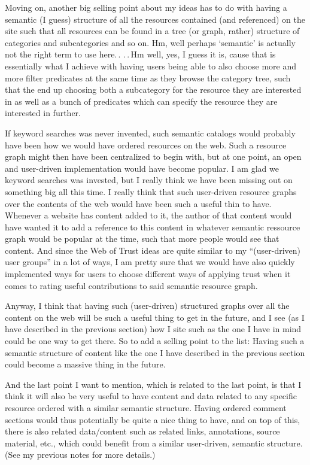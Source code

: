 \documentclass{report}
\begin{document}
Moving on, another big selling point about my ideas has to do with having a semantic (I guess) structure of all the resources contained (and referenced) on the site such that all resources can be found in a tree (or graph, rather) structure of categories and subcategories and so on. Hm, well perhaps `semantic' is actually not the right term to use here.\,. %
.\,.\,Hm well, yes, I guess it is, cause that is essentially what I achieve with having users being able to also choose more and more filter predicates at the same time as they browse the category tree, such that the end up choosing both a subcategory for the resource they are interested in as well as a bunch of predicates which can specify the resource they are interested in further. %

If keyword searches was never invented, such semantic catalogs would probably have been how we would have ordered resources on the web. Such a resource graph might then have been centralized to begin with, but at one point, an open and user-driven implementation would have become popular. I am glad we keyword searches was invested, but I really think we have been missing out on something big all this time. I really think that such user-driven resource graphs over the contents of the web would have been such a useful thin to have. Whenever a website has content added to it, the author of that content would have wanted it to add a reference to this content in whatever semantic ressource graph would be popular at the time, such that more people would see that content. And since the Web of Trust ideas are quite similar to my ``(user-driven) user groups'' in a lot of ways, I am pretty sure that we would have also quickly implemented ways for users to choose different ways of applying trust when it comes to rating useful contributions to said semantic resource graph. 

Anyway, I think that having such (user-driven) structured graphs over all the content on the web will be such a useful thing to get in the future, and I see (as I have described in the previous section) how I site such as the one I have in mind could be one way to get there. So to add a selling point to the list: Having such a semantic structure of content like the one I have described in the previous section could become a massive thing in the future. 

And the last point I want to mention, which is related to the last point, is that I think it will also be very useful to have content and data related to any specific resource ordered with a similar semantic structure. Having ordered comment sections would thus potentially be quite a nice thing to have, and on top of this, there is also related data/content such as related links, annotations, source material, etc., which could benefit from a similar user-driven, semantic structure. (See my previous notes for more details.)
\end{document}
